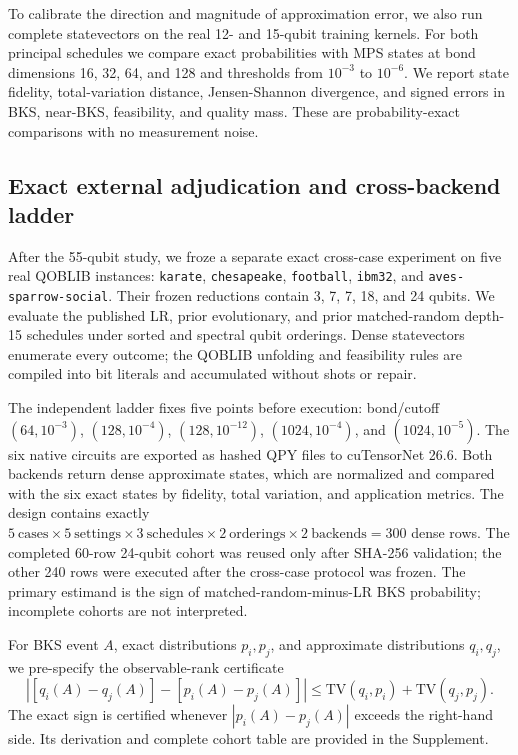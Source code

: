\documentclass[10pt,twocolumn]{article}
\begin{document}
To calibrate the direction and magnitude of approximation error, we also run
complete statevectors on the real 12- and 15-qubit training kernels. For both
principal schedules we compare exact probabilities with MPS states at bond
dimensions 16, 32, 64, and 128 and thresholds from $10^{-3}$ to $10^{-6}$.
We report state fidelity, total-variation distance, Jensen-Shannon divergence,
and signed errors in BKS, near-BKS, feasibility, and quality mass. These are
probability-exact comparisons with no measurement noise.

\subsection{Exact external adjudication and cross-backend ladder}

After the 55-qubit study, we froze a separate exact cross-case experiment on
five real QOBLIB instances: \texttt{karate}, \texttt{chesapeake},
\texttt{football}, \texttt{ibm32}, and \texttt{aves-sparrow-social}. Their
frozen reductions contain 3, 7, 7, 18, and 24 qubits. We evaluate the published
LR, prior evolutionary, and prior matched-random depth-15 schedules under
sorted and spectral qubit orderings. Dense statevectors enumerate every
outcome; the QOBLIB unfolding and feasibility rules are compiled into bit
literals and accumulated without shots or repair.

The independent ladder fixes five points before execution: bond/cutoff
$(64,10^{-3})$, $(128,10^{-4})$, $(128,10^{-12})$,
$(1024,10^{-4})$, and $(1024,10^{-5})$. The six native circuits are exported as
hashed QPY files to cuTensorNet 26.6. Both backends return dense approximate
states, which are normalized and compared with the six exact states by fidelity,
total variation, and application metrics. The design contains exactly
$5\ \text{cases}\times5\ \text{settings}\times3\ \text{schedules}\times
2\ \text{orderings}\times2\ \text{backends}=300$ dense rows. The completed
60-row 24-qubit cohort was reused only after SHA-256 validation; the other 240
rows were executed after the cross-case protocol was frozen. The primary
estimand is the sign of matched-random-minus-LR BKS probability; incomplete
cohorts are not interpreted.

For BKS event $A$, exact distributions $p_i,p_j$, and approximate distributions
$q_i,q_j$, we pre-specify the observable-rank certificate
\begin{equation}
|[q_i(A)-q_j(A)]-[p_i(A)-p_j(A)]|
\leq \mathrm{TV}(q_i,p_i)+\mathrm{TV}(q_j,p_j).
\label{eq:tvd-cert}
\end{equation}
The exact sign is certified whenever $|p_i(A)-p_j(A)|$ exceeds the right-hand
side. Its derivation and complete cohort table are provided in the Supplement.
\end{document}
